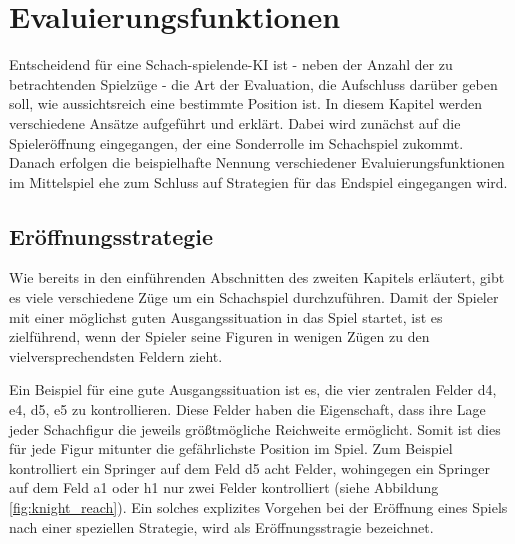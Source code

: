 \section{Evaluierungsfunktionen}\label{evaluation_func}

Entscheidend für eine Schach-spielende-KI ist - neben der Anzahl der zu betrachtenden Spielzüge - die Art der Evaluation, die Aufschluss darüber geben soll, wie aussichtsreich eine bestimmte Position ist. In diesem Kapitel werden verschiedene Ansätze aufgeführt und erklärt. Dabei wird zunächst auf die Spieleröffnung eingegangen, der eine Sonderrolle im Schachspiel zukommt. Danach erfolgen die beispielhafte Nennung verschiedener Evaluierungsfunktionen im Mittelspiel ehe zum Schluss auf Strategien für das Endspiel eingegangen wird.

\subsection{Eröffnungsstrategie}\label{opening_evaluation}
Wie bereits in den einführenden Abschnitten des zweiten Kapitels erläutert, gibt es viele verschiedene Züge um ein Schachspiel durchzuführen. Damit der Spieler mit einer möglichst guten Ausgangssituation in das Spiel startet, ist es zielführend, wenn der Spieler seine Figuren in wenigen  Zügen zu den vielversprechendsten Feldern zieht.\cite{O.V.}


Ein Beispiel für eine gute Ausgangssituation ist es, die vier zentralen Felder d4, e4, d5, e5 zu kontrollieren. Diese Felder haben die Eigenschaft, dass ihre Lage jeder Schachfigur die jeweils größtmögliche Reichweite ermöglicht. Somit ist dies für jede Figur mitunter die gefährlichste Position im Spiel. Zum Beispiel kontrolliert ein Springer auf dem Feld d5 acht Felder, wohingegen ein Springer auf dem Feld a1 oder h1 nur zwei Felder kontrolliert (siehe Abbildung \ref{fig:knight_reach}). Ein solches explizites Vorgehen bei der Eröffnung eines Spiels nach einer speziellen Strategie, wird als Eröffnungsstragie bezeichnet.\cite{O.V.2017}

